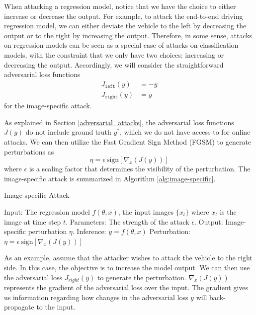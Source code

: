 When attacking a regression model, notice that we have the choice to either increase or decrease the output. For example, to attack the end-to-end driving regression model, we can either deviate the vehicle to the left by decreasing the output or to the right by increasing the output. Therefore, in some sense, attacks on regression models can be seen as a special case of attacks on classification models, with the constraint that we only have two choices: increasing or decreasing the output. Accordingly, we will consider the straightforward adversarial loss functions 
\begin{align}
    J_{\texttt{left}}(y) &= -y \\
    J_{\texttt{right}}(y) &= y
\end{align}
for the image-specific attack. 

As explained in Section \ref{adversarial_attacks}, the adversarial loss functions $J(y)$ do not include ground truth $y^{*}$, which we do not have access to for online attacks. We can then utilize the Fast Gradient Sign Method (FGSM) to generate perturbations as 
\begin{equation}
    \eta = \epsilon \ \text{sign}[\nabla_{x}( J(y))]
\end{equation}
where $\epsilon$ is a scaling factor that determines the visibility of the perturbation. The image-specific attack is summarized in Algorithm \ref{alg:image-specific}.

\begin{algorithm}[t]
    \caption{Image-specific Attack}\label{alg:image-specific}
    \begin{algorithmic}
        \STATE Input: The regression model $f(\theta, x)$, the input images $\{x_t\}$ where $x_t$ is the image at time step $t$.
        \STATE Parameters: The strength of the attack $\epsilon$.
        \STATE Output: Image-specific perturbation $\eta$.
            \STATE Inference: $y = f(\theta, x)$
            \STATE Perturbation: $\eta = \epsilon \ \text{sign}[\nabla_{x}( J(y))]$
        \ENDFOR
    \end{algorithmic}
\end{algorithm}

As an example, assume that the attacker wishes to attack the vehicle to the right side. In this case, the objective is to increase the model output. We can then use the adversarial loss $J_{right}(y)$ to generate the perturbation. $\nabla_{x}( J(y))$ represents the gradient of the adversarial loss over the input. The gradient gives us information regarding how changes in the adversarial loss $y$ will back-propagate to the input.

